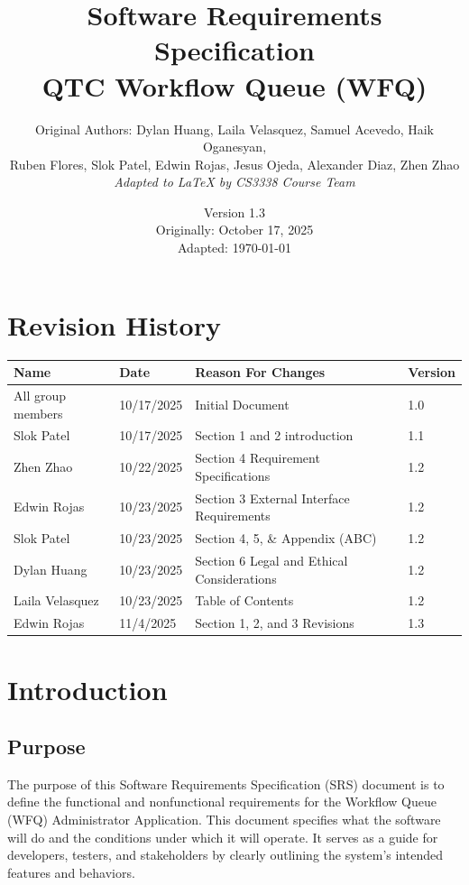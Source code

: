 \documentclass[12pt]{article}
\title{Software Requirements Specification\\
\large QTC Workflow Queue (WFQ)}
\author{Original Authors: Dylan Huang, Laila Velasquez, Samuel Acevedo, Haik Oganesyan,\\
Ruben Flores, Slok Patel, Edwin Rojas, Jesus Ojeda, Alexander Diaz, Zhen Zhao\\[0.5em]
\textit{Adapted to \LaTeX{} by CS3338 Course Team}}
\date{Version 1.3 \\ Originally: October 17, 2025 \\ Adapted: \today}
\begin{document}
\maketitle
\newpage
\tableofcontents
\newpage

\section*{Revision History}
\begin{center}
\begin{tabular}{llll}
\toprule
Name & Date & Reason For Changes & Version \\
\midrule
All group members  & 10/17/2025 & Initial Document                          & 1.0 \\
Slok Patel         & 10/17/2025 & Section 1 and 2 introduction              & 1.1 \\
Zhen Zhao          & 10/22/2025 & Section 4 Requirement Specifications      & 1.2 \\
Edwin Rojas        & 10/23/2025 & Section 3 External Interface Requirements & 1.2 \\
Slok Patel         & 10/23/2025 & Section 4, 5, \& Appendix (ABC)          & 1.2 \\
Dylan Huang        & 10/23/2025 & Section 6 Legal and Ethical Considerations & 1.2 \\
Laila Velasquez    & 10/23/2025 & Table of Contents                         & 1.2 \\
Edwin Rojas        & 11/4/2025  & Section 1, 2, and 3 Revisions            & 1.3 \\
\bottomrule
\end{tabular}
\end{center}
\newpage

\section{Introduction}

\subsection{Purpose}
The purpose of this Software Requirements Specification (SRS) document is to define the
functional and nonfunctional requirements for the Workflow Queue (WFQ) Administrator
Application. This document specifies what the software will do and the conditions under which
it will operate. It serves as a guide for developers, testers, and stakeholders by clearly
outlining the system's intended features and behaviors.
\end{document}
